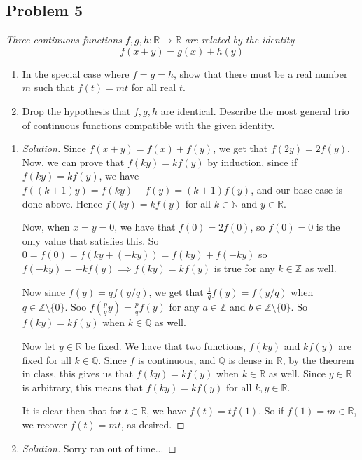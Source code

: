 \documentclass{article}
\newcommand{\N}{{\mathbb N}}
\newcommand{\Z}{{\mathbb Z}}
\newcommand{\Q}{{\mathbb Q}}
\newcommand{\R}{{\mathbb R}}
\begin{document}
\subsection*{Problem 5}
{\it Three continuous functions $f,g,h \colon \R \to \R$ are related by the identity
\[
	f(x+y) = g(x) + h(y)
\]
\begin{enumerate}
	\item In the special case where $f=g=h$, show that there must
	be a real number $m$ such that $f(t) = mt$ for all real $t$.
	\item Drop the hypothesis that $f,g,h$ are identical.
	Describe the most general trio of continuous functions
	compatible with the given identity.
\end{enumerate}}

\begin{enumerate}
	\item \begin{proof}[Solution]\let\qed\relax
		Since $f(x+y) = f(x) + f(y)$, we get that $f(2y) = 2f(y)$.
		Now, we can prove that $f(ky) = kf(y)$ by induction,
		since if $f(ky) = kf(y)$, we have $f((k+1)y) = f(ky)+f(y)=(k+1)f(y)$,
		and our base case is done above.
		Hence $f(ky) = kf(y)$ for all $k \in \N$ and $y \in \R$.

		Now, when $x = y = 0$, we have that $f(0) = 2f(0)$,
		so $f(0) = 0$ is the only value that satisfies this.
		So $0 = f(0) = f(ky +(-ky)) = f(ky) + f(-ky)$
		so $f(-ky) = -kf(y) \implies f(ky) = kf(y)$ is true for any $k \in \Z$ as well.

		Now since $f(y) = qf(y/q)$, we get that $\frac{1}{q}f(y)=f(y/q)$
		when $q \in \Z \setminus \{0\}$.
		Soo $f(\frac{p}{q}y) = \frac{p}{q}f(y)$ for any $a \in \Z$ and $b \in \Z\setminus \{0\}$.
		So $f(ky) = kf(y)$ when $k \in \Q$ as well.

		Now let $y \in \R$ be fixed.
		We have that two functions, $f(ky)$ and $kf(y)$
		are fixed for all $k \in \Q$.
		Since $f$ is continuous, and $\Q$ is dense in $\R$,
		by the theorem in class,
		this gives us that $f(ky) = kf(y)$ when $k \in \R$ as well.
		Since $y \in \R$ is arbitrary, this means that $f(ky) = kf(y)$
		for all $k,y \in \R$.

		It is clear then that for $t \in \R$,
		we have $f(t) = tf(1)$.
		So if $f(1) = m \in \R$, we recover $f(t) = mt$, as desired.
	\end{proof}
	\item \begin{proof}[Solution]\let\qed\relax
		Sorry ran out of time...
	\end{proof}
\end{enumerate}
\clearpage
~\clearpage
\end{document}
